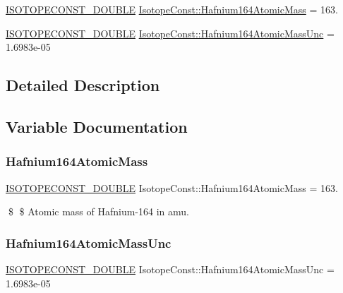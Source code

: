 \begin{DoxyCompactItemize}
\item 
\mbox{\hyperlink{group___isotope_const-_macros_ga8f45a7272ce02c0b4c65c44636ed719a}{I\+S\+O\+T\+O\+P\+E\+C\+O\+N\+S\+T\+\_\+\+D\+O\+U\+B\+LE}} \mbox{\hyperlink{group___isotope_const-_hafnium-_hf164_ga66cafeca9650ec1cd5cee3efb41d52bc}{Isotope\+Const\+::\+Hafnium164\+Atomic\+Mass}} = 163.
\item 
\mbox{\hyperlink{group___isotope_const-_macros_ga8f45a7272ce02c0b4c65c44636ed719a}{I\+S\+O\+T\+O\+P\+E\+C\+O\+N\+S\+T\+\_\+\+D\+O\+U\+B\+LE}} \mbox{\hyperlink{group___isotope_const-_hafnium-_hf164_gaa2181eadf69caac73275ab1a85213bd9}{Isotope\+Const\+::\+Hafnium164\+Atomic\+Mass\+Unc}} = 1.\+6983e-\/05
\end{DoxyCompactItemize}


\subsection{Detailed Description}


\subsection{Variable Documentation}
\mbox{\label{group___isotope_const-_hafnium-_hf164_ga66cafeca9650ec1cd5cee3efb41d52bc}} 
\subsubsection{\texorpdfstring{Hafnium164\+Atomic\+Mass}{Hafnium164AtomicMass}}
{\footnotesize\ttfamily \mbox{\hyperlink{group___isotope_const-_macros_ga8f45a7272ce02c0b4c65c44636ed719a}{I\+S\+O\+T\+O\+P\+E\+C\+O\+N\+S\+T\+\_\+\+D\+O\+U\+B\+LE}} Isotope\+Const\+::\+Hafnium164\+Atomic\+Mass = 163.}

\$ \$ Atomic mass of Hafnium-\/164 in amu. \mbox{\label{group___isotope_const-_hafnium-_hf164_gaa2181eadf69caac73275ab1a85213bd9}} 
\subsubsection{\texorpdfstring{Hafnium164\+Atomic\+Mass\+Unc}{Hafnium164AtomicMassUnc}}
{\footnotesize\ttfamily \mbox{\hyperlink{group___isotope_const-_macros_ga8f45a7272ce02c0b4c65c44636ed719a}{I\+S\+O\+T\+O\+P\+E\+C\+O\+N\+S\+T\+\_\+\+D\+O\+U\+B\+LE}} Isotope\+Const\+::\+Hafnium164\+Atomic\+Mass\+Unc = 1.\+6983e-\/05}

